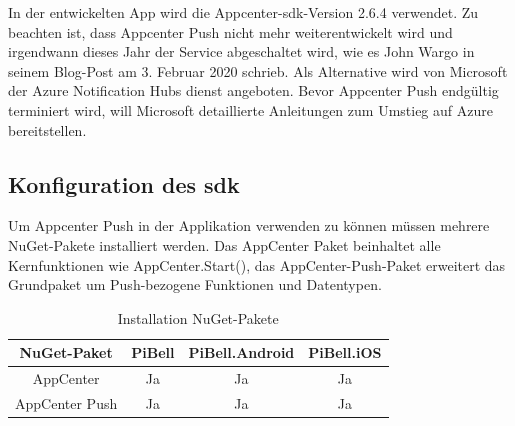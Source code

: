 In der entwickelten App wird die Appcenter-\acs{sdk}-Version 2.6.4 verwendet. Zu beachten ist, dass Appcenter Push nicht mehr weiterentwickelt wird und irgendwann dieses Jahr der Service abgeschaltet wird, wie es John Wargo in seinem Blog-Post am 3. Februar 2020 schrieb. Als Alternative wird von Microsoft der Azure Notification Hubs dienst angeboten. Bevor Appcenter Push endgültig terminiert wird, will Microsoft detaillierte Anleitungen zum Umstieg auf Azure bereitstellen.\par

\subsection{Konfiguration des \acs{sdk}}
Um Appcenter Push in der Applikation verwenden zu können müssen mehrere NuGet-Pakete installiert werden.
Das AppCenter Paket beinhaltet alle Kernfunktionen wie AppCenter.Start(), das AppCenter-Push-Paket erweitert das Grundpaket um Push-bezogene Funktionen und Datentypen.
\begin{table}[H]
    \centering\begin{tabular}{|c|c|c|c|}
        \hline
        NuGet-Paket & PiBell & PiBell.Android & PiBell.iOS\\
        \hline
        AppCenter & Ja & Ja & Ja\\
        AppCenter Push & Ja & Ja & Ja\\
        \hline    
    \end{tabular}
    \caption{Installation NuGet-Pakete}
\end{table}